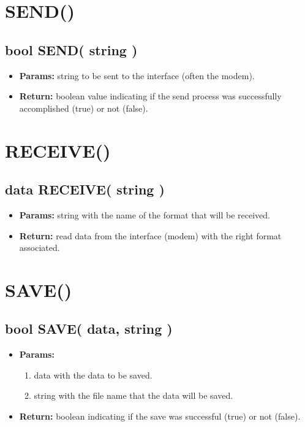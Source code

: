 \documentclass[11pt,a4paper]{article}
\begin{document}
\section*{SEND()}
\begin{framed}
\subsection*{bool SEND( string )}
\begin{itemize}
\item \textbf{Params:} string to be sent to the interface (often the modem).
\item \textbf{Return:} boolean value indicating if the send process was successfully accomplished (true) or not (false).
\end{itemize}
\end{framed}

\section*{RECEIVE()}
\begin{framed}
\subsection*{data RECEIVE( string )}
\begin{itemize}
\item \textbf{Params:} string with the name of the format that will be received.
\item \textbf{Return:} read data from the interface  (modem) with the right format associated.
\end{itemize}
\end{framed}

\section*{SAVE()}
\begin{framed}
\subsection*{bool SAVE( data, string )}
\begin{itemize}
\item \textbf{Params:}
\begin{enumerate}
\item data with the data to be saved.
\item string with the file name that the data will be saved.
\end{enumerate}
\item \textbf{Return:} boolean indicating if the save was successful (true) or not (false).
\end{itemize}
\end{framed}
\end{document}
